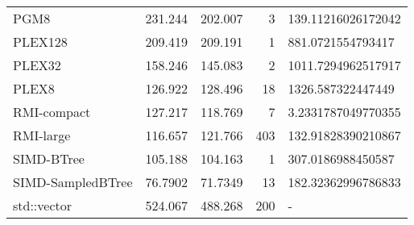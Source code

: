 \begin{tabular}{lrrrl}
 PGM8              &               231.244  &              202.007  &            3 & 139.11216026172042 \\
 PLEX128           &               209.419  &              209.191  &            1 & 881.0721554793417  \\
 PLEX32            &               158.246  &              145.083  &            2 & 1011.7294962517917 \\
 PLEX8             &               126.922  &              128.496  &           18 & 1326.587322447449  \\
 RMI-compact       &               127.217  &              118.769  &            7 & 3.2331787049770355 \\
 RMI-large         &               116.657  &              121.766  &          403 & 132.91828390210867 \\
 SIMD-BTree        &               105.188  &              104.163  &            1 & 307.0186988450587  \\
 SIMD-SampledBTree &                76.7902 &               71.7349 &           13 & 182.32362996786833 \\
 std::vector       &               524.067  &              488.268  &          200 & -                  \\
\hline
\end{tabular}